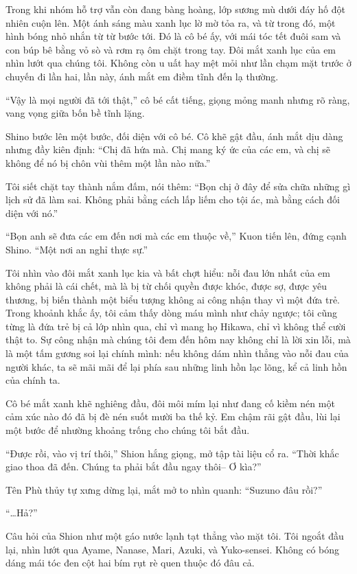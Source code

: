 \documentclass[../main.tex]{subfiles}
\begin{document}
Trong khi nhóm hỗ trợ vẫn còn đang bàng hoàng, lớp sương mù dưới đáy hố đột nhiên cuộn lên. Một ánh sáng màu xanh lục lờ mờ tỏa ra, và từ trong đó, một hình bóng nhỏ nhắn từ từ bước tới. Đó là cô bé ấy, với mái tóc tết đuôi sam và con búp bê bằng vỏ sò và rơm rạ ôm chặt trong tay. Đôi mắt xanh lục của em nhìn lướt qua chúng tôi. Không còn u uất hay mệt mỏi như lần chạm mặt trước ở chuyến đi lần hai, lần này, ánh mắt em điềm tĩnh đến lạ thường.

``Vậy là mọi người đã tới thật,'' cô bé cất tiếng, giọng mỏng manh nhưng rõ ràng, vang vọng giữa bốn bề tĩnh lặng.

Shino bước lên một bước, đối diện với cô bé. Cô khẽ gật đầu, ánh mắt dịu dàng nhưng đầy kiên định: ``Chị đã hứa mà. Chị mang ký ức của các em, và chị sẽ không để nó bị chôn vùi thêm một lần nào nữa.''

Tôi siết chặt tay thành nắm đấm, nói thêm: ``Bọn chị ở đây để sửa chữa những gì lịch sử đã làm sai. Không phải bằng cách lấp liếm cho tội ác, mà bằng cách đối diện với nó.''

``Bọn anh sẽ đưa các em đến nơi mà các em thuộc về,'' Kuon tiến lên, đứng cạnh Shino. ``Một nơi an nghỉ thực sự.''

Tôi nhìn vào đôi mắt xanh lục kia và bất chợt hiểu: nỗi đau lớn nhất của em không phải là cái chết, mà là bị từ chối quyền được khóc, được sợ, được yêu thương, bị biến thành một biểu tượng không ai công nhận thay vì một đứa trẻ. Trong khoảnh khắc ấy, tôi cảm thấy dòng máu mình như chảy ngược; tôi cũng từng là đứa trẻ bị cả lớp nhìn qua, chỉ vì mang họ Hikawa, chỉ vì không thể cười thật to. Sự công nhận mà chúng tôi đem đến hôm nay không chỉ là lời xin lỗi, mà là một tấm gương soi lại chính mình: nếu không dám nhìn thẳng vào nỗi đau của người khác, ta sẽ mãi mãi để lại phía sau những linh hồn lạc lõng, kể cả linh hồn của chính ta.

Cô bé mắt xanh khẽ nghiêng đầu, đôi môi mím lại như đang cố kiềm nén một cảm xúc nào đó đã bị đè nén suốt mười ba thế kỷ. Em chậm rãi gật đầu, lùi lại một bước để nhường khoảng trống cho chúng tôi bắt đầu.

``Được rồi, vào vị trí thôi,'' Shion hắng giọng, mở tập tài liệu cổ ra. ``Thời khắc giao thoa đã đến. Chúng ta phải bắt đầu ngay thôi-- Ơ kìa?''

Tên Phù thủy tự xưng dừng lại, mắt mở to nhìn quanh: ``Suzuno đâu rồi?''

``\dots Hả?''

Câu hỏi của Shion như một gáo nước lạnh tạt thẳng vào mặt tôi. Tôi ngoắt đầu lại, nhìn lướt qua Ayame, Nanase, Mari, Azuki, và Yuko-sensei.  Không có bóng dáng mái tóc đen cột hai bím rụt rè quen thuộc đó đâu cả.
\end{document}
